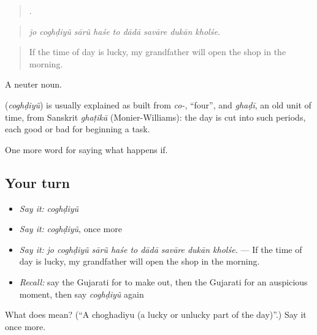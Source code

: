 \begin{quote}
        .
\end{quote}

\begin{quote}
\emph{jo coghḍiyũ sārũ haśe to dādā savāre dukān kholśe.}
\end{quote}

\begin{quote}
If the time of day is lucky, my grandfather will open the shop in the morning.
\end{quote}

A neuter noun.

\begin{cousinweb}
\textbf{} (\emph{coghḍiyũ}) is usually explained as built from \emph{co-}, \textquotedblleft{}four\textquotedblright{}, and \emph{ghaḍī}, an old unit of time, from Sanskrit \emph{ghaṭikā} (Monier-Williams): the day is cut into such periods, each good or bad for beginning a task.
\end{cousinweb}

\begin{grammarlens}[title={What you've built}]
One more word for saying what happens if.
\end{grammarlens}

\subsection*{Your turn}
\begin{itemize}
\raggedright
  \item \emph{Say it:} \emph{coghḍiyũ}
  \item \emph{Say it:} \emph{coghḍiyũ}, once more
  \item \emph{Say it:} \emph{jo coghḍiyũ sārũ haśe to dādā savāre dukān kholśe.} — If the time of day is lucky, my grandfather will open the shop in the morning.
  \item \emph{Recall:} say the Gujarati for to make out, then the Gujarati for an auspicious moment, then say \emph{coghḍiyũ} again
\end{itemize}

\begin{tcolorbox}[breakable,colback=teal!4,colframe=teal!35!black,title={Before you move on}]
What does  mean? (\textquotedblleft{}A choghadiyu (a lucky or unlucky part of the day)\textquotedblright{}.) Say it once more.
\end{tcolorbox}
